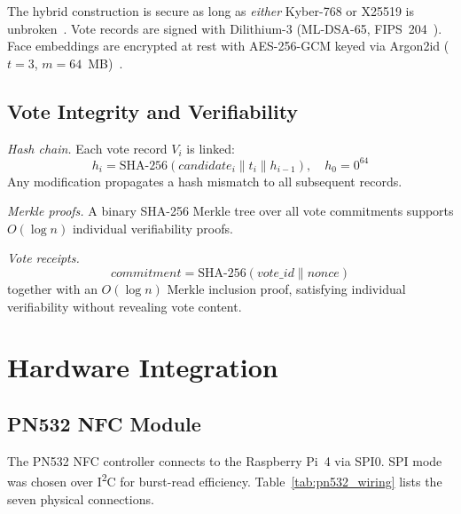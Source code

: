 \documentclass[submission]{sacjsub}
\begin{document}
The hybrid construction is secure as long as \emph{either} Kyber-768
or X25519 is unbroken~\cite{bernstein2017post}. Vote records are signed
with Dilithium-3 (ML-DSA-65, FIPS~204~\cite{nist_fips204}). Face
embeddings are encrypted at rest with AES-256-GCM keyed via Argon2id
(\(t{=}3\), \(m{=}64\)~MB)~\cite{biryukov2016argon2}.

\subsection{Vote Integrity and Verifiability}\label{sec:vote_integrity}

\textit{Hash chain.} Each vote record \(V_i\) is linked:
\begin{equation}
  h_i = \mathrm{SHA\text{-}256}(\mathit{candidate}_i \| t_i \| h_{i-1}),
  \quad h_0 = 0^{64}
\end{equation}
Any modification propagates a hash mismatch to all subsequent records.

\textit{Merkle proofs.} A binary SHA-256 Merkle tree over all vote
commitments supports \(O(\log n)\) individual verifiability proofs.

\textit{Vote receipts.}
\begin{equation}
  \mathit{commitment} = \mathrm{SHA\text{-}256}(\mathit{vote\_id} \|
  \mathit{nonce})
\end{equation}
together with an \(O(\log n)\) Merkle inclusion proof, satisfying
individual verifiability without revealing vote content.

\section{Hardware Integration}\label{sec:hardware}

\subsection{PN532 NFC Module}

The PN532 NFC controller connects to the Raspberry Pi~4 via SPI0. SPI
mode was chosen over I\textsuperscript{2}C for burst-read efficiency.
Table~\ref{tab:pn532_wiring} lists the seven physical connections.
\end{document}
